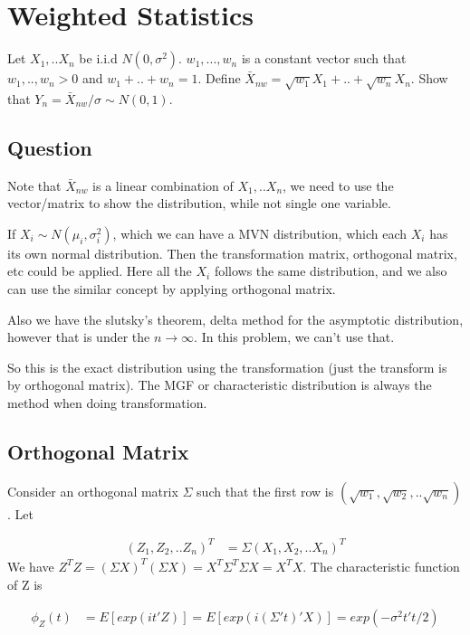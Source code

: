 \documentclass[11pt]{article} %
\begin{document}
\section{Weighted Statistics}
Let $X_1,.. X_n$ be i.i.d $N(0, \sigma^2)$. $w_1, ..., w_n$ is a constant vector such that $w_1,.., w_n > 0$ and $w_1 + .. + w_n = 1$. Define $\bar{X}_{nw} = \sqrt{w_1} X_1 + .. + \sqrt{w_n} X_n$. Show that $Y_n = \bar{X}_{nw}/\sigma \sim N(0,1)$. 

\subsection{Question}

Note that $\bar{X}_{nw}$ is a linear combination of $X_1,.. X_n$, we need to use the vector/matrix to show the distribution, while not single one variable. 

If $X_i \sim N(\mu_i, \sigma_i^2)$, which we can have a MVN distribution, which each $X_i$ has its own normal distribution. Then the transformation matrix, orthogonal matrix, etc could be applied. Here all the $X_i$ follows the same distribution, and we also can use the similar concept by applying orthogonal matrix. 

Also we have the slutsky's theorem, delta method for the asymptotic distribution, however that is under the $n \rightarrow \infty$. In this problem, we can't use that.

So this is the exact distribution using the transformation (just the transform is by orthogonal matrix). The MGF or characteristic distribution is always the method when doing transformation.



\subsection{Orthogonal Matrix}

Consider an orthogonal matrix $\Sigma$ such that the first row is $(\sqrt{w_1}, \sqrt{w_2},.. \sqrt{w_n})$. Let

\begin{align*}
	(Z_1, Z_2,.. Z_n)^T &= \Sigma  (X_1, X_2,.. X_n)^T
\end{align*}
We have $Z^T Z = (\Sigma X)^T (\Sigma X) = X^T \Sigma^T \Sigma X = X^T X$. The characteristic function of Z is 

\begin{align*}
	\phi_Z(t) &= E[exp(i t'Z)] = E[exp(i (\Sigma' t)' X)] = exp(-\sigma^2 t't/2)
\end{align*}
\end{document}
